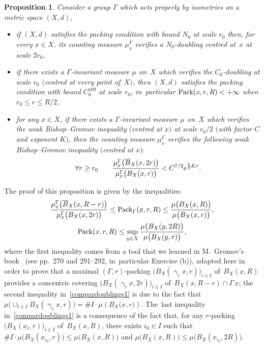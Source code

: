 \documentclass[10pt,a4paper]{amsart}
\numberwithin{equation}{section}
\newtheorem{prop}[theor]{Proposition}
\newcommand{\g}{\operatorname{\gamma}}
\begin{document}
\begin{prop}\label{comparedoublings} Consider a group $\Gamma$ which acts
properly by isometries on a metric space $ (X,d)$,
\begin{itemize}\itemsep=0pt
\item[$(i)$]
if $(X,d)$ satisfies the packing condition with bound $N_0$ at scale $r_0$ then, for every $x \in X$, its counting measure $\mu_{x}^{\Gamma}$
verifies a $N_0$-doubling centred at~$x$ at scale $2 r_0$,
\item[$(ii)$]
if there exists a $\Gamma $-invariant measure $\mu$ on~$X$ which verifies the $ C_0 $-doubling at scale $r_0$ $($centred at every point of~$X)$, then $ (X,d)$ satisfies the packing condition with bound $C_0^{109}$ at scale $r_0$, in~particular ${\rm Pack} (x, r, R) < +\infty$ when $r_0 \le r \le R/2$,
\item[$(iii)$]
for any $x \in X$, if there exists a $\Gamma $-invariant measure $\mu$ on~$X$ which verifies the weak Bishop--Gromov inequality $($centred at $x)$
at scale $r_0/2$ $($with factor $C$ and exponent $K)$, then
the counting measure $\mu_{x}^{\Gamma} $ verifies the following weak Bishop--Gromov inequality $($centred at $x){:}$
\begin{gather*}
\forall r \ge r_0\qquad
\dfrac{\mu_{x}^{\Gamma} \big(\overline B_X(x, 2 r)\big)}{\mu_{x}^{\Gamma} \big(B_X ( x, r)\big)} < C^{7/2} {\rm e}^{\frac{5}{2}K r}.
\end{gather*}
\end{itemize}
\end{prop}

The proof of this proposition is given by the inequalities:
\begin{gather}
\dfrac{\mu_{x}^{\Gamma} \big(\overline B_X(x, R- r)\big)}{\mu_{x}^{\Gamma}\big(B_X ( x, 2 r)\big)}
\le {\rm Pack}_\Gamma (x, r, R) \le \dfrac{\mu \big(B_X(x, R)\big)}{\mu\big(B_X(x,r)\big)},\nonumber
\\
\label{compardoublings1}
{\rm Pack} (x, r, R) \le \sup_{y \in X} \dfrac{\mu \big(B_X(y, 2R)\big)}{\mu\big(B_X(y, r)\big)},
\end{gather}
where the first inequality comes from a tool that we learned in M.~Gromov's book~\cite{Gr1} (see pp.~270 and 291--292, in~particular Exercise (b)), adapted here in order to prove that a maximal
$(\Gamma,r)$-packing $\big(B_X (\g_i x, r)\big)_{i \in I}$ of~$B_X (x, R)$ provides a concentric covering $\big(B_X (\g_i x, 2 r)\big)_{i \in I}$ of~$\overline B_X (x, R- r) \cap \Gamma \,x$; the second inequality in~\eqref{compardoublings1} is due to the fact that
$\mu \big(\cup_{i \in I} B_X (\g_i x, r)\big) = \# I \cdot \mu \left(B_X \big( x, r \big) \right)$. The~last inequality in~\eqref{compardoublings1} is a consequence
of the fact that, for any $r$-packing $\big(B_X(x_i,r)\big)_{i \in I}$ of~$B_X (x,R)$, there exists $i_0 \in I$ such that
$\# I \cdot \mu \big(B_X(x_{i_0}, r)\big) \le \mu \big(B_X(x, R)\big)$ and $\mu \big(B_X(x, R)\big) \le
\mu \big(B_X( x_{i_0}, 2 R)\big)$.
\end{document}
